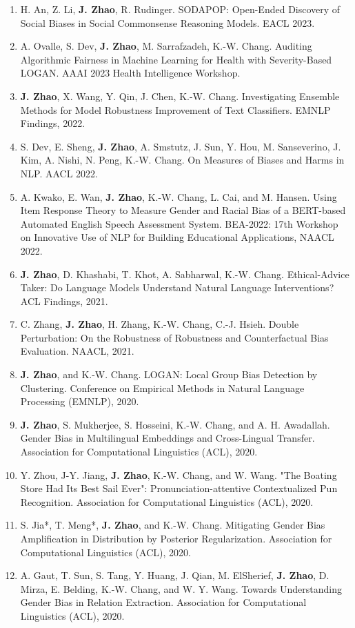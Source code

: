 \documentclass[11pt, a4paper]{article}
\begin{document}
\begin{enumerate}
	\item H. An, Z. Li, \textbf{J. Zhao}, R. Rudinger. SODAPOP: Open-Ended Discovery of Social Biases in Social Commonsense Reasoning Models. EACL 2023.
 	\item A. Ovalle, S. Dev, \textbf{J. Zhao}, M. Sarrafzadeh, K.-W. Chang. Auditing Algorithmic Fairness in Machine Learning for Health with Severity-Based LOGAN. AAAI 2023 Health Intelligence Workshop.
	\item \textbf{J. Zhao}, X. Wang, Y. Qin, J. Chen, K.-W. Chang. Investigating Ensemble Methods for Model Robustness Improvement of Text Classifiers. EMNLP Findings, 2022.
	\item S. Dev, E. Sheng, \textbf{J. Zhao},  A. Smstutz, J. Sun, Y. Hou, M. Sanseverino, J. Kim, A. Nishi, N. Peng, K.-W. Chang. On Measures of Biases and Harms in NLP. AACL 2022.
	\item A.  Kwako, E. Wan, \textbf{J. Zhao}, K.-W. Chang, L. Cai, and M. Hansen. Using Item Response Theory to Measure Gender and Racial Bias of a BERT-based Automated English Speech Assessment System. BEA-2022: 17th Workshop on Innovative Use of NLP for Building Educational Applications, NAACL 2022.
	\item \textbf{J. Zhao}, D. Khashabi, T. Khot, A. Sabharwal, K.-W. Chang. Ethical-Advice Taker: Do Language Models Understand Natural Language Interventions? ACL Findings, 2021.
	\item C. Zhang, \textbf{J. Zhao}, H. Zhang, K.-W. Chang, C.-J. Hsieh. Double Perturbation: On the Robustness of Robustness and Counterfactual Bias Evaluation. NAACL, 2021.
	\item \textbf{J. Zhao}, and K.-W. Chang. LOGAN: Local Group Bias Detection by Clustering. Conference on Empirical Methods in Natural Language Processing (EMNLP), 2020. 
	\item \textbf{J. Zhao}, S. Mukherjee, S. Hosseini, K.-W. Chang, and A. H. Awadallah. Gender Bias in Multilingual Embeddings and Cross-Lingual Transfer. Association for Computational Linguistics (ACL), 2020.
	\item Y. Zhou, J-Y. Jiang, \textbf{J. Zhao}, K.-W. Chang, and W. Wang. "The Boating Store Had Its Best Sail Ever": Pronunciation-attentive Contextualized Pun Recognition. Association for Computational Linguistics (ACL), 2020.
	\item S. Jia*, T. Meng*, \textbf{J. Zhao}, and K.-W. Chang. Mitigating Gender Bias Amplification in Distribution by Posterior Regularization. Association for Computational Linguistics (ACL), 2020.
	\item A. Gaut, T. Sun, S. Tang, Y. Huang, J. Qian, M. ElSherief, \textbf{J. Zhao}, D. Mirza, E. Belding, K.-W. Chang, and W. Y. Wang. Towards Understanding Gender Bias in Relation Extraction. Association for Computational Linguistics (ACL), 2020.

\end{enumerate}
\end{document}
